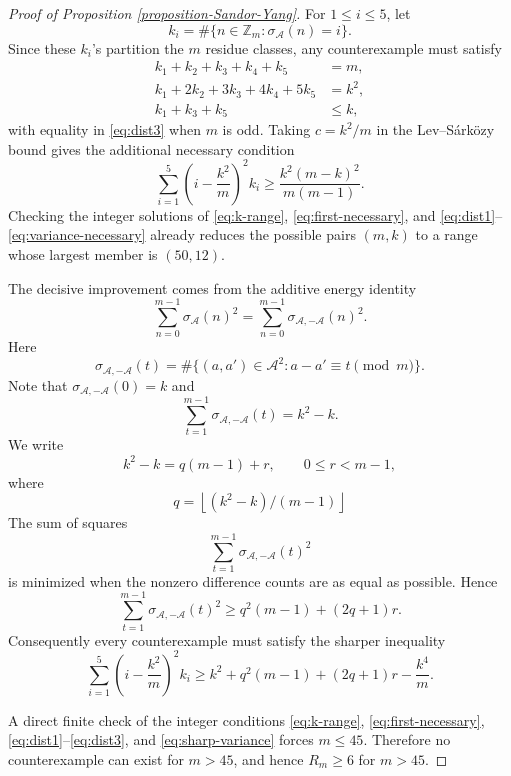 \documentclass[12pt,a4paper,reqno]{amsart}
\numberwithin{equation}{section}
\def\Z{{\mathbb Z}}
\newcommand{\floor}[1]{\left\lfloor #1\right\rfloor}
\theoremstyle{plain}
\theoremstyle{definition}
\begin{document}
\begin{proof}[Proof of Proposition \ref{proposition-Sandor-Yang}]
For $1\le i\le 5$, let
\[
k_i=\#\big\{n\in \Z_m:\sigma_{\mathcal{A}}(n)=i\big\}.
\]
Since these \(k_i\)'s partition the \(m\) residue classes, any
counterexample must satisfy
\begin{align}
k_1+k_2+k_3+k_4+k_5&=m, \label{eq:dist1}\\
k_1+2k_2+3k_3+4k_4+5k_5&=k^2, \label{eq:dist2}\\
k_1+k_3+k_5&\le k, \label{eq:dist3}
\end{align}
with equality in \eqref{eq:dist3} when \(m\) is odd.  Taking
\(c=k^2/m\) in the Lev--S\'ark\"ozy bound gives the additional
necessary condition
\begin{equation}\label{eq:variance-necessary}
\sum_{i=1}^5\left(i-\frac{k^2}{m}\right)^2k_i
\ge
\frac{k^2(m-k)^2}{m(m-1)}.
\end{equation}
Checking the integer solutions of \eqref{eq:k-range},
\eqref{eq:first-necessary}, and \eqref{eq:dist1}--\eqref{eq:variance-necessary}
already reduces the possible pairs \((m,k)\) to a range whose largest
member is \((50,12)\).

The decisive improvement comes from the additive energy identity
\[
\sum_{n=0}^{m-1}\sigma_{\mathcal{A}}(n)^2=\sum_{n=0}^{m-1}\sigma_{\mathcal{A},-\mathcal{A}}(n)^2.
\]
Here \[\sigma_{\mathcal{A},-\mathcal{A}}(t)=\#\big\{(a,a')\in \mathcal{A}^2:a-a'\equiv t\pmod m\big\}.\]  Note that
\(\sigma_{\mathcal{A},-\mathcal{A}}(0)=k\) and
\[
\sum_{t=1}^{m-1}\sigma_{\mathcal{A},-\mathcal{A}}(t)=k^2-k.
\]
 We write
\[
k^2-k=q(m-1)+r,\qquad 0\le r<m-1,
\]
where 
\[
q=\floor{(k^2-k)/(m-1)}
\]
The sum of squares
\[\sum_{t=1}^{m-1}\sigma_{\mathcal{A},-\mathcal{A}}(t)^2\] is minimized when the nonzero
difference counts are as equal as possible.  Hence
\[
\sum_{t=1}^{m-1}\sigma_{\mathcal{A},-\mathcal{A}}(t)^2\ge q^2(m-1)+(2q+1)r.
\]
Consequently every counterexample must satisfy the sharper inequality
\begin{equation}\label{eq:sharp-variance}
\sum_{i=1}^5\left(i-\frac{k^2}{m}\right)^2k_i
\ge
k^2+q^2(m-1)+(2q+1)r-\frac{k^4}{m}.
\end{equation}

A direct finite check of the integer conditions
\eqref{eq:k-range}, \eqref{eq:first-necessary},
\eqref{eq:dist1}--\eqref{eq:dist3}, and \eqref{eq:sharp-variance}
forces \(m\le 45\).
Therefore no counterexample can
exist for \(m>45\), and hence \(R_m\ge 6\) for \(m>45\).
\end{proof}
\end{document}
